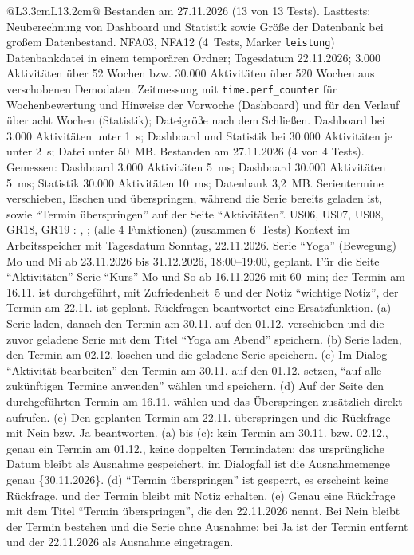 \begin{longtable}{@{}L{3.3cm}L{13.2cm}@{}}
    {Bestanden am 27.11.2026 (13 von 13 Tests).}
  \midrule
    {Lasttests: Neuberechnung von Dashboard und Statistik sowie Größe der Datenbank bei großem Datenbestand.}
    {NFA03, NFA12}
    { (4~Tests, Marker \texttt{leistung})}
    {Datenbankdatei in einem temporären Ordner; Tagesdatum 22.11.2026; 3.000 Aktivitäten über 52 Wochen bzw. 30.000 Aktivitäten über 520 Wochen aus verschobenen Demodaten.}
    {Zeitmessung mit \texttt{time.perf\_counter} für Wochenbewertung und Hinweise der Vorwoche (Dashboard) und für den Verlauf über acht Wochen (Statistik); Dateigröße nach dem Schließen.}
    {Dashboard bei 3.000 Aktivitäten unter 1~s; Dashboard und Statistik bei 30.000 Aktivitäten je unter 2~s; Datei unter 50~MB.}
    {Bestanden am 27.11.2026 (4 von 4 Tests). Gemessen: Dashboard 3.000 Aktivitäten 5~ms; Dashboard 30.000 Aktivitäten 5~ms; Statistik 30.000 Aktivitäten 10~ms; Datenbank 3,2~MB.}
  \midrule
    {Serientermine verschieben, löschen und überspringen, während die Serie bereits geladen ist, sowie \enquote{Termin überspringen} auf der Seite \enquote{Aktivitäten}.}
    {US06, US07, US08, GR18, GR19}
    {: , ;  (alle 4 Funktionen) (zusammen 6~Tests)}
    {Kontext im Arbeitsspeicher mit Tagesdatum Sonntag, 22.11.2026. Serie \enquote{Yoga} (Bewegung) Mo und Mi ab 23.11.2026 bis 31.12.2026, 18:00--19:00, geplant. Für die Seite \enquote{Aktivitäten} Serie \enquote{Kurs} Mo und So ab 16.11.2026 mit 60~min; der Termin am 16.11. ist durchgeführt, mit Zufriedenheit~5 und der Notiz \enquote{wichtige Notiz}, der Termin am 22.11. ist geplant. Rückfragen beantwortet eine Ersatzfunktion.}
    {(a) Serie laden, danach den Termin am 30.11. auf den 01.12. verschieben und die zuvor geladene Serie mit dem Titel \enquote{Yoga am Abend} speichern. (b) Serie laden, den Termin am 02.12. löschen und die geladene Serie speichern. (c) Im Dialog \enquote{Aktivität bearbeiten} den Termin am 30.11. auf den 01.12. setzen, \enquote{auf alle zukünftigen Termine anwenden} wählen und speichern. (d) Auf der Seite den durchgeführten Termin am 16.11. wählen und das Überspringen zusätzlich direkt aufrufen. (e) Den geplanten Termin am 22.11. überspringen und die Rückfrage mit Nein bzw. Ja beantworten.}
    {(a) bis (c): kein Termin am 30.11. bzw. 02.12., genau ein Termin am 01.12., keine doppelten Termindaten; das ursprüngliche Datum bleibt als Ausnahme gespeichert, im Dialogfall ist die Ausnahmemenge genau \{30.11.2026\}. (d) \enquote{Termin überspringen} ist gesperrt, es erscheint keine Rückfrage, und der Termin bleibt mit Notiz erhalten. (e) Genau eine Rückfrage mit dem Titel \enquote{Termin überspringen}, die den 22.11.2026 nennt. Bei Nein bleibt der Termin bestehen und die Serie ohne Ausnahme; bei Ja ist der Termin entfernt und der 22.11.2026 als Ausnahme eingetragen.}

\end{longtable}
